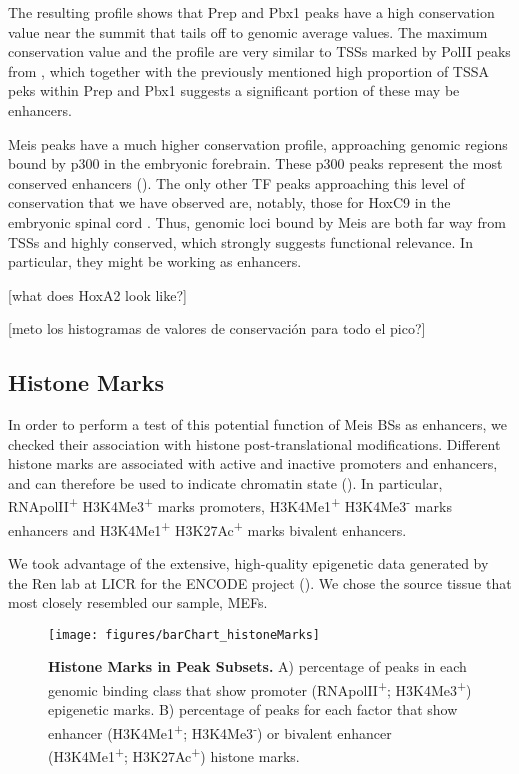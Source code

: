 The resulting profile shows that Prep and Pbx1 peaks have a high conservation value near the summit that tails off to genomic average values. The maximum conservation value and the profile are very similar to \acp{TSS} marked by \ac{PolII} peaks from \cite{Mahony2011}, which together with the previously mentioned high proportion of \ac{TSSA} peks within Prep and Pbx1 suggests a significant portion of these may be enhancers.

Meis peaks have a much higher conservation profile, approaching genomic regions bound by p300 in the embryonic forebrain. These p300 peaks represent the most conserved enhancers (\cite{Blow2010}). The only other \ac{TF} peaks approaching this level of conservation that we have observed are, notably, those for HoxC9 in the embryonic spinal cord \cite{Jung2010}. Thus, genomic loci bound by Meis are both far way from \acp{TSS} and highly conserved, which strongly suggests functional relevance. In particular, they might be working as enhancers.

[what does HoxA2 look like?] 

[meto los histogramas de valores de conservación para todo el pico?]

\subsection{Histone Marks}

In order to perform a test of this potential function of Meis \acp{BS} as enhancers, we checked their association with histone post-translational modifications. Different histone marks are associated with active and inactive promoters and enhancers, and can therefore be used to indicate chromatin state (\cite{Mikkelsen2007}). In particular, RNApolII\textsuperscript{+} H3K4Me3\textsuperscript{+} marks promoters,  H3K4Me1\textsuperscript{+} H3K4Me3\textsuperscript{-} marks enhancers and H3K4Me1\textsuperscript{+} H3K27Ac\textsuperscript{+} marks bivalent enhancers. 

We took advantage of the extensive, high-quality epigenetic data generated by the Ren lab at LICR for the ENCODE project (\cite{Shen2012}). We chose the source tissue that most closely resembled our sample, \acp{MEF}. 

\begin{figure}[]
  \centering
  \texttt{[image: figures/barChart\_histoneMarks]}
  \caption[Histone Marks in Peak Subsets]{\textbf{Histone Marks in Peak Subsets.} A) percentage of peaks in each genomic binding class that show promoter (RNApolII\textsuperscript{+}; H3K4Me3\textsuperscript{+}) epigenetic marks. B) percentage of peaks for each factor that show enhancer (H3K4Me1\textsuperscript{+}; H3K4Me3\textsuperscript{-}) or bivalent enhancer (H3K4Me1\textsuperscript{+}; H3K27Ac\textsuperscript{+}) histone marks.}
  \label{fig:histoneMarks}
\end{figure}

